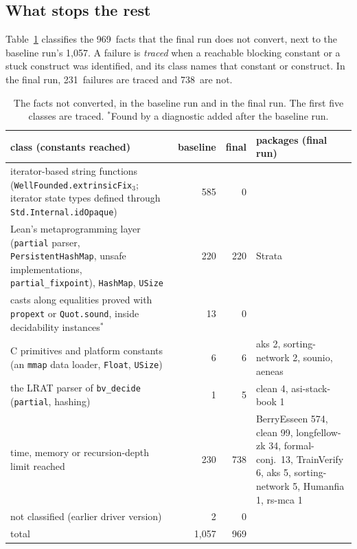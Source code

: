 \documentclass[11pt]{article}
\newcommand{\vtotfail}{969}   %
\newcommand{\vtraced}{231}   %
\newcommand{\vuntraced}{738}   %
\newcommand{\vresfail}{738}   %
\begin{document}
\subsection{What stops the rest}\label{sec:classes}
Table~\ref{tab:classes} classifies the \vtotfail\ facts that the final run does not convert, next to the
baseline run's 1,057. A failure is \emph{traced} when a reachable blocking constant or a stuck construct was
identified, and its class names that constant or construct. In the final run, \vtraced\ failures are traced
and \vuntraced\ are not.

\begin{table}[t]\centering\small
\begin{tabular}{>{\raggedright\arraybackslash}p{6.4cm}rr>{\raggedright\arraybackslash}p{5.0cm}}\toprule
class (constants reached) & baseline & final & packages (final run)\\\midrule
iterator-based string functions (\texttt{WellFounded.extrinsicFix\(_3\)}; iterator state types
defined through \texttt{Std.Internal.idOpaque}) & 585 & 0 & \\
Lean's metaprogramming layer (\texttt{partial} parser, \texttt{PersistentHashMap}, unsafe
implementations, \texttt{partial\_fixpoint}), \texttt{HashMap}, \texttt{USize} & 220 & 220 & Strata\\
casts along equalities proved with \texttt{propext} or \texttt{Quot.sound}, inside decidability
instances$^*$ & 13 & 0 & \\
C primitives and platform constants (an \texttt{mmap} data loader, \texttt{Float},
\texttt{USize}) & 6 & 6 & aks 2, sorting-network 2, sounio, aeneas\\
the LRAT parser of \texttt{bv\_decide} (\texttt{partial}, hashing) & 1 & 5 & clean 4, asi-stack-book 1\\\midrule
time, memory or recursion-depth limit reached & 230 & \vresfail & BerryEsseen 574, clean 99, longfellow-zk 34, formal-conj.\  13, TrainVerify 6, aks 5, sorting-network 5, Humanfia 1, rs-mca 1\\
not classified (earlier driver version) & 2 & 0 & \\\midrule
total & 1,057 & \vtotfail & \\\bottomrule
\end{tabular}
\caption{The facts not converted, in the baseline run and in the final run. The first five classes are
traced. $^*$Found by a diagnostic added after the baseline run.}
\label{tab:classes}
\end{table}
\end{document}
